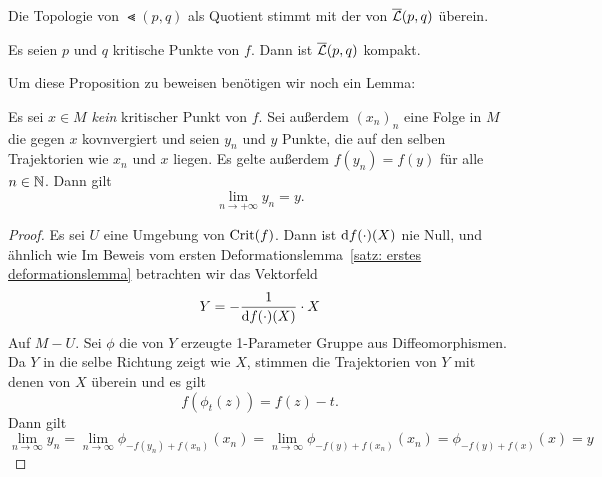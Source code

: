 \begin{remark}
    Die Topologie von $\Lt(p, q)$ als Quotient stimmt mit der von ${\overline{\mathcal{L}} }(p, q)$ überein.
    \todo{}
\end{remark}

\begin{prop}
    \label{prop: Lb ist kompakt}
    Es seien $p$ und $q$ kritische Punkte von $f$. Dann ist ${\overline{\mathcal{L}} } (p, q)$ kompakt.
\end{prop}

Um diese Proposition zu beweisen benötigen wir noch ein Lemma:

\begin{lemma}
    \label{lemma: konvergenz einer folge}
    Es sei $x \in M$ \emph{kein} kritischer Punkt von $f$. Sei außerdem $(x_n)_n$ eine Folge in
    $M$ die gegen $x$ kovnvergiert und seien $y_n$ und $y$ Punkte, die auf den selben Trajektorien
    wie $x_n$ und $x$ liegen. Es gelte außerdem $f(y_n) = f(y)$ für alle $n \in { \mathbb N }$. Dann gilt
    \[ \lim_{n \to + \infty} y_n = y . \]
\end{lemma}

\begin{proof}
    Es sei $U$ eine Umgebung von ${ \operatorname{Crit} } (f)$. Dann ist ${ \operatorname{d} } f (\cdot) (X)$ nie Null, und ähnlich wie 
    Im Beweis vom ersten Deformationslemma~\ref{satz: erstes deformationslemma} betrachten wir das
    Vektorfeld 
    \[ Y = - \frac{1}{{ \operatorname{d} } f (\cdot) (X)} \cdot X \]
    Auf $M - U$. Sei $\phi$ die von $Y$ erzeugte 1-Parameter Gruppe aus Diffeomorphismen. 
    Da $Y$ in die selbe Richtung zeigt wie $X$, stimmen die Trajektorien von $Y$ mit denen von $X$ 
    überein und es gilt 
    \[ f(\phi_t(z)) = f(z) - t . \]
    Dann gilt
    \[ \lim_{n \to \infty} y_n 
    = \lim_{n \to \infty} \phi_{- f(y_n) + f(x_n)}(x_n) 
    = \lim_{n \to \infty} \phi_{- f(y) + f(x_n)}(x_n) 
    = \phi_{- f(y) + f(x)}(x) = y \]
\end{proof}

